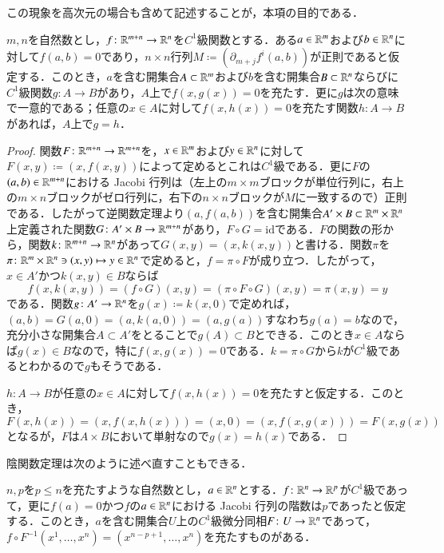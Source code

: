 この現象を高次元の場合も含めて記述することが，本項の目的である．

\begin{thm}[陰関数定理]$m,n$を自然数とし，$f \colon \mathbb{R}^{m+n} \to \mathbb{R}^n$を$C^1$級関数とする．ある$a \in \mathbb{R}^m$および$b \in \mathbb{R}^n$に対して$f(a,b)=0$であり，$n \times n$行列$M \coloneqq (\partial_{m+j} f^i (a,b))$が正則であると仮定する．このとき，$a$を含む開集合$A \subset \mathbb{R}^m$および$b$を含む開集合$B \subset \mathbb{R}^n$ならびに$C^1$級関数$g \colon A \to B$があり，$A$上で$f(x,g(x))=0$を充たす．更に$g$は次の意味で一意的である；任意の$x \in A$に対して$f(x,h(x))=0$を充たす関数$h \colon A \to B$があれば，$A$上で$g=h$．
\end{thm}

\begin{proof}
関数$F \colon \mathbb{R}^{m+n} \to \mathbb{R}^{m+n}$を，$x\in \mathbb{R}^m$および$y \in \mathbb{R}^n$に対して$F(x,y) \coloneqq (x,f(x,y))$によって定めるとこれは$C^1級$である．更に$F$の$(a,b) \in \mathbb{R}^{m+n}$における Jacobi 行列は（左上の$m \times m$ブロックが単位行列に，右上の$m \times n$ブロックがゼロ行列に，右下の$n \times n$ブロックが$M$に一致するので）正則である．したがって逆関数定理より$(a,f(a,b))$を含む開集合$A' \times B \subset \mathbb{R}^m \times \mathbb{R}^n$上定義された関数$G \colon A' \times B \to \mathbb{R}^{m+n}$があり，$F \circ G = \mathrm{id}$である．$F$の関数の形から，関数$k \colon \mathbb{R}^{m+n} \to \mathbb{R}^n$があって$G(x,y) = (x,k(x,y))$と書ける．関数$\pi$を$\pi \colon \mathbb{R}^m \times \mathbb{R}^n \ni (x,y) \mapsto y \in \mathbb{R}^n$で定めると，$f = \pi \circ F$が成り立つ．したがって，$x \in A'$かつ$k(x,y) \in B$ならば
\begin{equation}
f(x,k(x,y)) = (f \circ G)(x,y) = (\pi \circ F \circ G)(x,y) = \pi (x,y) = y
\end{equation}である．関数$g \colon A' \to \mathbb{R}^n$を$g(x) \coloneqq k(x,0)$で定めれば，$(a,b)=G(a,0)=(a,k(a,0))=(a,g(a))$すなわち$g(a)=b$なので，充分小さな開集合$A \subset A'$をとることで$g(A) \subset B$とできる．このとき$x \in A$ならば$g(x) \in B$なので，特に$f(x,g(x))=0$である．$k = \pi \circ G$から$k$が$C^1$級であるとわかるので$g$もそうである．

$h \colon A \to B$が任意の$x \in A$に対して$f(x,h(x))=0$を充たすと仮定する．このとき，$F(x,h(x)) = (x,f(x,h(x))) = (x,0) = (x,f(x,g(x))) = F(x,g(x))$となるが，$F$は$A \times B$において単射なので$g(x)=h(x)$である．
\end{proof}

陰関数定理は次のように述べ直すこともできる．

\begin{thm}\label{陰関数定理の言い換え}
$n,p$を$p \leq n$を充たすような自然数とし，$a \in \mathbb{R}^n$とする．$f \colon \mathbb{R}^n \to \mathbb{R}^p$が$C^1$級であって，更に$f(a) = 0$かつ$f$の$a \in \mathbb{R}^n$における Jacobi 行列の階数は$p$であったと仮定する．このとき，$a$を含む開集合$U$上の$C^1$級微分同相$F \colon U \to \mathbb{R}^n$であって，$f \circ F^{-1} (x^1, \dots, x^n) = (x^{n-p +1}, \dots, x^n)$を充たすものがある．
\end{thm}

